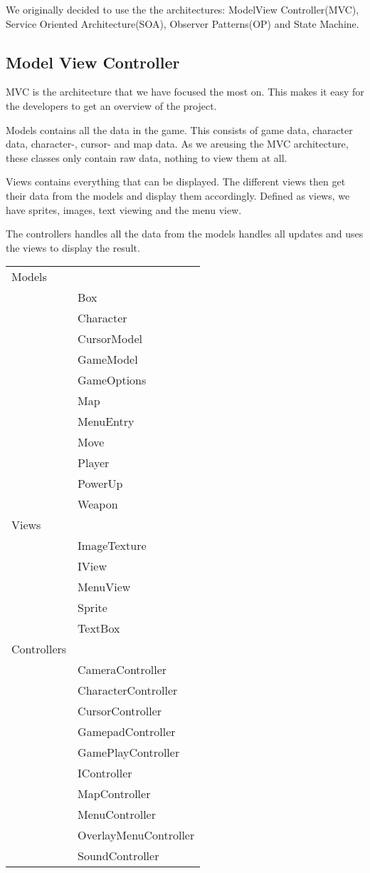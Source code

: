 We originally decided to use the the architectures: ModelView Controller(MVC), Service Oriented Architecture(SOA), Observer Patterns(OP) and State Machine.


\subsection{Model View Controller}
MVC is the architecture that we have focused the most on. This makes it easy for the developers to get an overview of the project.

Models contains all the data in the game. This consists of game data, character data, character-, cursor- and map data. As we areusing the MVC architecture, these classes only contain raw data, nothing to view them at all.

Views contains everything that can be displayed. The different views then get their data from the models and display them accordingly. Defined as views, we have sprites, images, text viewing and the menu view.

The controllers handles all the data from the models handles all updates and uses the views to display the result.\\


\begin{tabular}{ll}
Models & \\
&Box\\
&Character\\
&CursorModel\\
&GameModel\\
&GameOptions\\
&Map\\
&MenuEntry\\
&Move\\
&Player\\
&PowerUp\\
&Weapon\\

Views & \\
&ImageTexture\\
&IView\\
&MenuView\\
&Sprite\\
&TextBox\\

Controllers & \\
&CameraController\\
&CharacterController\\
&CursorController\\
&GamepadController\\
&GamePlayController\\
&IController\\
&MapController\\
&MenuController\\
&OverlayMenuController\\
&SoundController\\
\end{tabular}




